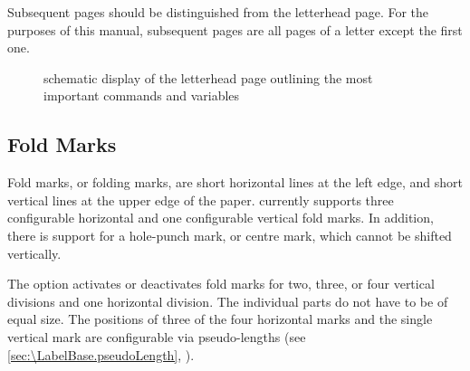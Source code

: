 Subsequent pages should be
distinguished from the letterhead page. For the purposes of this manual,
subsequent pages are all pages of a letter except the first one.

\begin{figure}
  \centering
  \tikzset{x=.56mm,y=-.56mm}
  \tiny
  
  \caption{schematic display of the letterhead page outlining the most
    important commands and variables}
  \label{fig:\LabelBase.variables}
\end{figure}


\subsection{Fold Marks}
\BeginIndexGroup
{}%

Fold marks, or folding marks, are short horizontal lines at the left edge, and
short vertical lines at the upper edge of the paper. \KOMAScript{} currently
supports three configurable horizontal and one configurable vertical fold
marks. In addition, there is support for a hole-punch mark, or centre mark,
which cannot be shifted vertically.

\begin{Declaration}
\end{Declaration}
The  option activates or deactivates fold marks for two,
three, or four vertical divisions and one horizontal division. The individual
parts do not have to be of equal size. The positions of three of the four
horizontal marks and the single vertical mark are configurable via
pseudo-lengths (see \autoref{sec:\LabelBase.pseudoLength},
).

